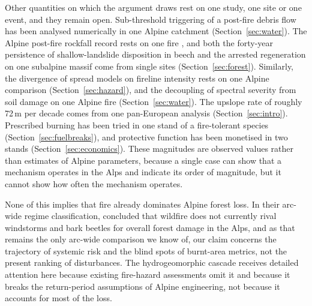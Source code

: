 \documentclass[11pt,a4paper]{article}
\begin{document}
Other quantities on which the argument draws rest on one study, one site or one event, and they remain open. Sub-threshold triggering of a post-fire debris flow has been analysed numerically in one Alpine catchment \citep{laporta_postwildfire_2025} (Section~\ref{sec:water}). The Alpine post-fire rockfall record rests on one fire \citep{melzner_brief_2019}, and both the forty-year persistence of shallow-landslide disposition in beech and the arrested regeneration on one subalpine massif come from single sites (Section~\ref{sec:forest}). Similarly, the divergence of spread models on fireline intensity rests on one Alpine comparison \citep{malanchini_modeling_2025} (Section~\ref{sec:hazard}), and the decoupling of spectral severity from soil damage on one Alpine fire \citep{negri_wildfire_2026} (Section~\ref{sec:water}). The upslope rate of roughly 72\,m per decade comes from one pan-European analysis \citep{beloiu_climatedriven_2026} (Section~\ref{sec:intro}). Prescribed burning has been tried in one stand of a fire-tolerant species (Section~\ref{sec:fuelbreaks}), and protective function has been monetised in two stands (Section~\ref{sec:economics}). These magnitudes are observed values rather than estimates of Alpine parameters, because a single case can show that a mechanism operates in the Alps and indicate its order of magnitude, but it cannot show how often the mechanism operates.

None of this implies that fire already dominates Alpine forest loss. In their arc-wide regime classification, \citet{conedera_characterizing_2018} concluded that wildfire does not currently rival windstorms and bark beetles for overall forest damage in the Alps, and as that remains the only arc-wide comparison we know of, our claim concerns the trajectory of systemic risk and the blind spots of burnt-area metrics, not the present ranking of disturbances. The hydrogeomorphic cascade receives detailed attention here because existing fire-hazard assessments omit it and because it breaks the return-period assumptions of Alpine engineering, not because it accounts for most of the loss.
\end{document}
